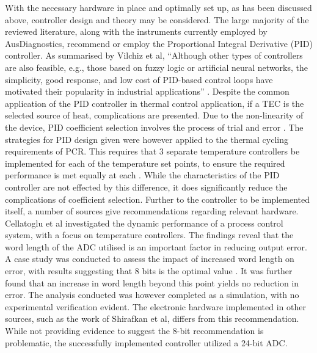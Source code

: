 With the necessary hardware in place and optimally set up, as has been discussed above, controller design and theory may be considered. The large majority of the reviewed literature, along with the instruments currently employed by AusDiagnostics, recommend or employ the Proportional Integral Derivative (PID) controller. As summarised by Vilchiz et al, ``Although other types of controllers are also feasible, e.g., those based on fuzzy logic or artificial neural networks, the simplicity, good response, and low cost of PID-based control loops have motivated their popularity in industrial applications'' \cite{20130415930883}\cite{20160801988967}. Despite the common application of the PID controller in thermal control application, if a TEC is the selected source of heat, complications are presented. Due to the non-linearity of the device, PID coefficient selection involves the process of trial and error \cite{20160801988967}. The strategies for PID design given were however applied to the thermal cycling requirements of PCR. This requires that 3 separate temperature controllers be implemented for each of the temperature set points, to ensure the required performance is met equally at each \cite{20160801988967}. While the characteristics of the PID controller are not effected by this difference, it does significantly reduce the complications of coefficient selection. Further to the controller to be implemented itself, a number of sources give recommendations regarding relevant hardware. Cellatoglu et al investigated the dynamic performance of a process control system, with a focus on temperature controllers. The findings reveal that the word length of the ADC utilised is an important factor in reducing output error. A case study was conducted to assess the impact of increased word length on error, with results suggesting that 8 bits is the optimal value \cite{12096602}. It was further found that an increase in word length beyond this point yields no reduction in error. The analysis conducted was however completed as a simulation, with no experimental verification evident. The electronic hardware implemented in other sources, such as the work of Shirafkan et al, differs from this recommendation. While  not providing evidence to suggest the 8-bit recommendation is problematic, the successfully implemented controller utilized a 24-bit ADC.\\


